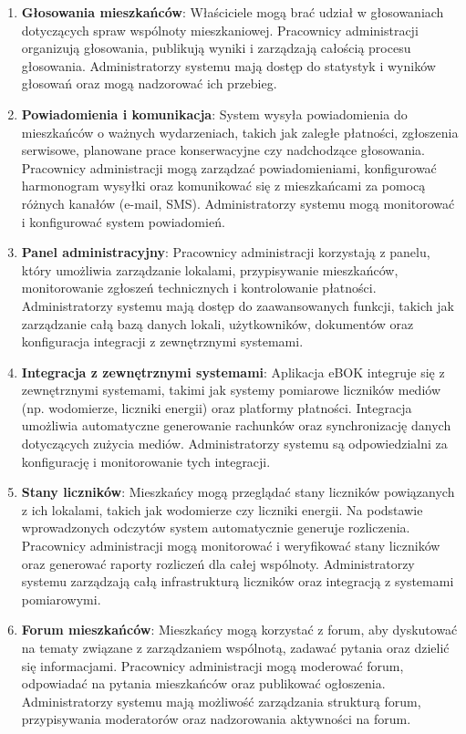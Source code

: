 \begin{enumerate}[label=\arabic*.]
	\item \textbf{Głosowania mieszkańców}: Właściciele mogą brać udział w głosowaniach dotyczących spraw wspólnoty mieszkaniowej. Pracownicy administracji organizują głosowania, publikują wyniki i zarządzają całością procesu głosowania. Administratorzy systemu mają dostęp do statystyk i wyników głosowań oraz mogą nadzorować ich przebieg.
	
	\item \textbf{Powiadomienia i komunikacja}: System wysyła powiadomienia do mieszkańców o ważnych wydarzeniach, takich jak zaległe płatności, zgłoszenia serwisowe, planowane prace konserwacyjne czy nadchodzące głosowania. Pracownicy administracji mogą zarządzać powiadomieniami, konfigurować harmonogram wysyłki oraz komunikować się z mieszkańcami za pomocą różnych kanałów (e-mail, SMS). Administratorzy systemu mogą monitorować i konfigurować system powiadomień.
	
	\item \textbf{Panel administracyjny}: Pracownicy administracji korzystają z panelu, który umożliwia zarządzanie lokalami, przypisywanie mieszkańców, monitorowanie zgłoszeń technicznych i kontrolowanie płatności. Administratorzy systemu mają dostęp do zaawansowanych funkcji, takich jak zarządzanie całą bazą danych lokali, użytkowników, dokumentów oraz konfiguracja integracji z zewnętrznymi systemami.
	
	\item \textbf{Integracja z zewnętrznymi systemami}: Aplikacja eBOK integruje się z zewnętrznymi systemami, takimi jak systemy pomiarowe liczników mediów (np. wodomierze, liczniki energii) oraz platformy płatności. Integracja umożliwia automatyczne generowanie rachunków oraz synchronizację danych dotyczących zużycia mediów. Administratorzy systemu są odpowiedzialni za konfigurację i monitorowanie tych integracji.
	
	\item \textbf{Stany liczników}: Mieszkańcy mogą przeglądać stany liczników powiązanych z ich lokalami, takich jak wodomierze czy liczniki energii. Na podstawie wprowadzonych odczytów system automatycznie generuje rozliczenia. Pracownicy administracji mogą monitorować i weryfikować stany liczników oraz generować raporty rozliczeń dla całej wspólnoty. Administratorzy systemu zarządzają całą infrastrukturą liczników oraz integracją z systemami pomiarowymi.
	
	\item \textbf{Forum mieszkańców}: Mieszkańcy mogą korzystać z forum, aby dyskutować na tematy związane z zarządzaniem wspólnotą, zadawać pytania oraz dzielić się informacjami. Pracownicy administracji mogą moderować forum, odpowiadać na pytania mieszkańców oraz publikować ogłoszenia. Administratorzy systemu mają możliwość zarządzania strukturą forum, przypisywania moderatorów oraz nadzorowania aktywności na forum.
	
\end{enumerate}

